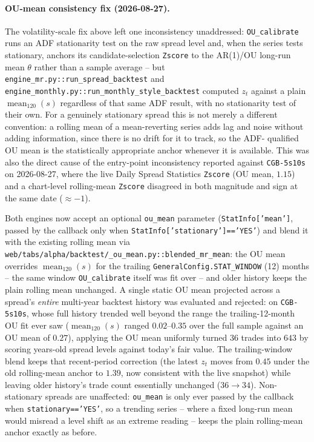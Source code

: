 \paragraph{OU-mean consistency fix (2026-08-27).} The volatility-scale fix above left
one inconsistency unaddressed: \texttt{OU\_calibrate} runs an ADF stationarity test on
the raw spread level and, when the series tests stationary, anchors its
candidate-selection \texttt{Zscore} to the AR(1)/OU long-run mean $\theta$ rather than
a sample average -- but \texttt{engine\_mr.py::run\_spread\_backtest} and
\texttt{engine\_monthly.py::run\_monthly\_style\_backtest} computed $z_t$ against a
plain $\operatorname{mean}_{120}(s)$ regardless of that same ADF result, with no
stationarity test of their own. For a genuinely stationary spread this is not merely a
different convention: a rolling mean of a mean-reverting series adds lag and noise
without adding information, since there is no drift for it to track, so the ADF-
qualified OU mean is the statistically appropriate anchor whenever it is available.
This was also the direct cause of the entry-point inconsistency reported against
\texttt{CGB-5s10s} on 2026-08-27, where the live Daily Spread Statistics
\texttt{Zscore} (OU mean, $1.15$) and a chart-level rolling-mean \texttt{Zscore}
disagreed in both magnitude and sign at the same date ($\approx-1$).

Both engines now accept an optional \texttt{ou\_mean} parameter
(\texttt{StatInfo['mean']}, passed by the callback only when
\texttt{StatInfo['stationary']=='YES'}) and blend it with the existing rolling mean via
\texttt{web/tabs/alpha/backtest/\_ou\_mean.py::blended\_mr\_mean}: the OU mean overrides
$\operatorname{mean}_{120}(s)$ for the trailing \texttt{GeneralConfig.STAT\_WINDOW}
(12) months -- the same window \texttt{OU\_calibrate} itself was fit over -- and older
history keeps the plain rolling mean unchanged. A single static OU mean projected
across a spread's \emph{entire} multi-year backtest history was evaluated and
rejected: on \texttt{CGB-5s10s}, whose full history trended well beyond the range the
trailing-12-month OU fit ever saw ($\operatorname{mean}_{120}(s)$ ranged
$0.02$--$0.35$ over the full sample against an OU mean of $0.27$), applying the OU mean
uniformly turned $36$ trades into $643$ by scoring years-old spread levels against
today's fair value. The trailing-window blend keeps that recent-period correction
(the latest $z_t$ moves from $0.45$ under the old rolling-mean anchor to $1.39$, now
consistent with the live snapshot) while leaving older history's trade count
essentially unchanged ($36\to34$). Non-stationary spreads are unaffected: \texttt{ou\_mean}
is only ever passed by the callback when \texttt{stationary=='YES'}, so a trending
series -- where a fixed long-run mean would misread a level shift as an extreme
reading -- keeps the plain rolling-mean anchor exactly as before.

